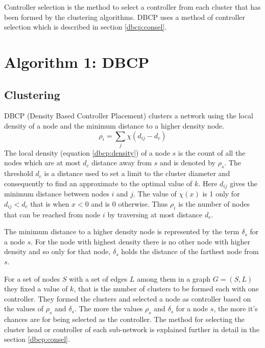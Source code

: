 \documentclass[10pt]{extarticle}
\begin{document}
	Controller selection is the method to select a controller from each cluster that has been formed by the clustering algorithms. DBCP uses a method of controller selection which is described in section \ref{dbcp:consel}.
	
	\section{Algorithm 1: DBCP\cite{dbcp}} \label{algo:dbcp}
	
	\subsection{Clustering} \label{dbcp:cluster}
	DBCP (Density Based Controller Placement) clusters a network using the local density of a node and the minimum distance to a higher density node.
	\begin{equation} \label{dbcp:density}
	\rho_i=\sum_j\chi(d_{ij}-d_c)
	\end{equation}
	The local density (equation \ref{dbcp:density}) of a node $s$ is the count of all the nodes which are at most $d_c$ distance away from $s$ and is denoted by $\rho_s$. The threshold $d_c$ is a distance used to set a limit to the cluster diameter and consequently to find an approximate to the optimal value of $k$.
	Here $d_{ij}$ gives the minimum distance between nodes $i$ and $j$. The value of $\chi(x)$ is 1 only for $d_{ij}<d_c$ that is when $x<0$ and is 0 otherwise. Thus $\rho_i$ is the number of nodes that can be reached from node $i$ by traversing at most distance $d_c$.
	
	The minimum distance to a higher density node is represented by the term $\delta_s$ for a node $s$. For the node with highest density there is no other node with higher density and so only for that node, $\delta_s$ holds the distance of the farthest node from $s$.
	
	For a set of nodes $S$ with a set of edges $L$ among them in a graph $G=(S,L)$ they fixed a value of $k$, that is the number of clusters to be formed each with one controller. They formed the clusters and selected a node as controller based on the values of $\rho_s$ and $\delta_s$. The more the values $\rho_s$ and $\delta_s$ for a node $s$, the more it's chances are for being selected as the controller. The method for selecting the cluster head or controller of each sub-network is explained further in detail in the section \ref{dbcp:consel}.
	
\end{document}
